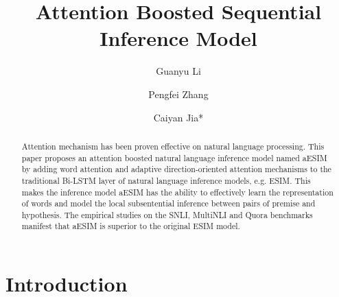 \documentclass[10pt,sigconf]{acmart}
\begin{document}
\title{Attention Boosted Sequential Inference Model}

\author{Guanyu Li}

\author{Pengfei Zhang}


\author{Caiyan Jia*}


\renewcommand{\shortauthors}{Guanyu Li et al.}


\begin{abstract}
Attention mechanism has been proven effective on natural language processing.  This paper proposes an attention boosted natural language inference model named aESIM by adding word attention and adaptive direction-oriented attention mechanisms to the traditional Bi-LSTM layer of natural language inference models, e.g. ESIM. This makes the inference model aESIM has the ability to effectively learn the representation of words and model the local subsentential inference between pairs of premise and hypothesis. The empirical studies on the SNLI, MultiNLI and Quora benchmarks manifest that aESIM is superior to the original ESIM model.
\end{abstract}








\maketitle

\section{Introduction}
\end{document}
